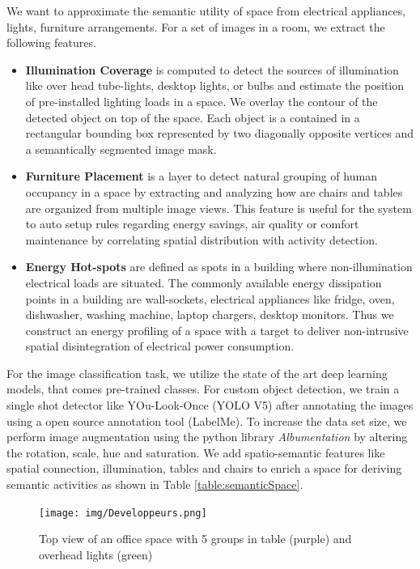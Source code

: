 We want to approximate the semantic utility of space from electrical appliances, lights, furniture  arrangements. For a set of images in a room, we extract the following features.
\begin{itemize}
    \item \textbf{Illumination Coverage} is computed to detect the sources of illumination like over head tube-lights, desktop lights, or bulbs and estimate the position of pre-installed lighting loads in a space. We overlay the contour of the detected object on top of the space. Each object is a contained in a rectangular bounding box represented by two diagonally opposite vertices and a semantically segmented image mask.  
    
    \item \textbf{Furniture Placement} is a layer to detect natural grouping of human occupancy in a space by extracting and analyzing how are chairs and tables are organized from multiple image views. This feature is useful for the system to auto setup rules regarding energy savings, air quality or comfort maintenance by correlating spatial distribution with activity detection.  
    
    \item \textbf{Energy Hot-spots} are defined as spots in a building where non-illumination electrical loads are situated. The commonly available energy dissipation points in a building are wall-sockets, electrical appliances like fridge, oven, dishwasher, washing machine, laptop chargers, desktop monitors. Thus we construct an energy profiling of a space with a target to deliver non-intrusive spatial disintegration of electrical power consumption. 
\end{itemize}


For the image classification task, we utilize the state of the art deep learning models, that comes pre-trained classes. For custom object detection, we train a single shot detector like YOu-Look-Once (YOLO V5) \cite{glenn2021yolov5} after annotating the images using a open source annotation tool (LabelMe). To increase the data set size, we perform image augmentation using the python library \textit{Albumentation} \cite{buslaev2018albumentation} by altering the rotation, scale, hue and saturation. We add spatio-semantic features like spatial connection, illumination, tables and chairs to enrich a space for deriving semantic activities as shown in Table \ref{table:semanticSpace}.  

\begin{figure}
    \centering
    \texttt{[image: img/Developpeurs.png]}
    \caption{Top view of an office space with 5 groups in table (purple) and overhead lights (green)}
    \label{fig:Developpeurs}
\end{figure}



